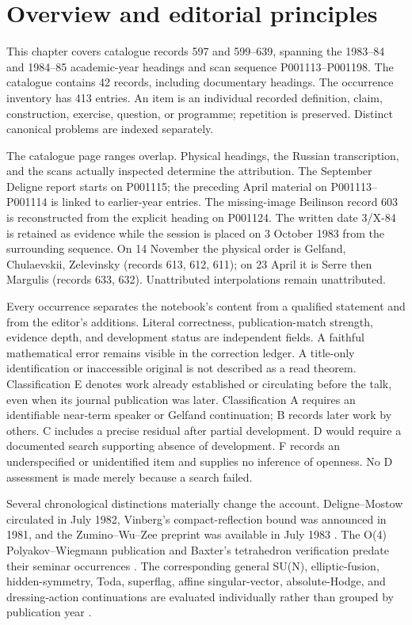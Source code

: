 \section{Overview and editorial principles}

This chapter covers catalogue records 597 and 599--639, spanning the 1983--84
and 1984--85 academic-year headings and scan sequence P001113--P001198.
The catalogue contains 42 records, including documentary headings.
The occurrence inventory has 413 entries. An item is an individual recorded
definition, claim, construction, exercise, question, or programme; repetition
is preserved. Distinct canonical problems are indexed separately.

The catalogue page ranges overlap. Physical headings, the Russian
transcription, and the scans actually inspected determine the attribution.
The September Deligne report starts on P001115; the preceding April material
on P001113--P001114 is linked to earlier-year entries.
The missing-image Beilinson record 603 is reconstructed from the explicit
heading on P001124. The written date 3/X-84 is retained as evidence while the
session is placed on 3 October 1983 from the surrounding sequence.
On 14 November the physical order is Gelfand, Chulaevskii, Zelevinsky
(records 613, 612, 611); on 23 April it is Serre then Margulis
(records 633, 632). Unattributed interpolations remain unattributed.

Every occurrence separates the notebook's content from a qualified statement
and from the editor's additions. Literal correctness, publication-match
strength, evidence depth, and development status are independent fields.
A faithful mathematical error remains visible in the correction ledger.
A title-only identification or inaccessible original is not described as a
read theorem. Classification E denotes work already established or circulating
before the talk, even when its journal publication was later. Classification A
requires an identifiable near-term speaker or Gelfand continuation; B records
later work by others. C includes a precise residual after partial development.
D would require a documented search supporting absence of development.
F records an underspecified or unidentified item and supplies no inference of
openness. No D assessment is made merely because a search failed.

Several chronological distinctions materially change the account.
Deligne--Mostow circulated in July 1982, Vinberg's compact-reflection bound
was announced in 1981, and the Zumino--Wu--Zee preprint was available in
July 1983 \citep{delignemostow1986monodromy,vinberg1981absence,zuminowuzee1984anomalies}.
The O(4) Polyakov--Wiegmann publication and Baxter's tetrahedron verification
predate their seminar occurrences
\citep{polyakovwiegmann1983goldstone,baxter1983tetrahedron}.
The corresponding general SU(N), elliptic-fusion, hidden-symmetry, Toda,
superflag, affine singular-vector, absolute-Hodge, and dressing-action
continuations are evaluated individually rather than grouped by publication
year \citep{wiegmann1984sun,cherednik1985finite,gelfandzelevinsky1984models,
berezanskii1985integration,penkov1988borel,malikovfeiginfuchs1986singular,
beilinson1986absolute,semenov1985dressing}.


